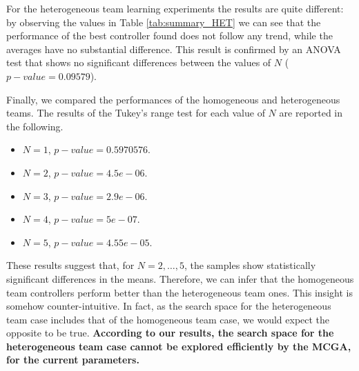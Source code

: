 \documentclass[journal]{IEEEtran}
\begin{document}
For the heterogeneous team learning experiments
the results are quite different: by observing the values in Table \ref{tab:summary_HET} we can see that the performance of the best controller found does not follow any trend,
while the averages have no substantial difference. This result is confirmed by an ANOVA test that shows no significant differences between the values of $N$ ($p-value=0.09579$).

Finally, we compared the performances of the homogeneous and heterogeneous teams. The results of the Tukey's range test for each value of $N$ are reported in the following.

\begin{itemize}
\item $N=1$, $p-value = 0.5970576$.
\item $N=2$, $p-value = 4.5e-06$.
\item $N=3$, $p-value = 2.9e-06$.
\item $N=4$, $p-value = 5e-07$.
\item $N=5$, $p-value = 4.55e-05$.
\end{itemize}

These results suggest that, for $N=2,\ldots,5$, the samples show statistically significant differences in the means. Therefore, we can infer that the homogeneous team controllers perform better than the heterogeneous team ones. This insight is somehow counter-intuitive. In fact, as the search space for the heterogeneous team case includes that of the homogeneous team case, we would expect the opposite to be true. \textbf{According to our results, the search space for the heterogeneous team case cannot be explored efficiently by the MCGA, for the current parameters.}
\end{document}
